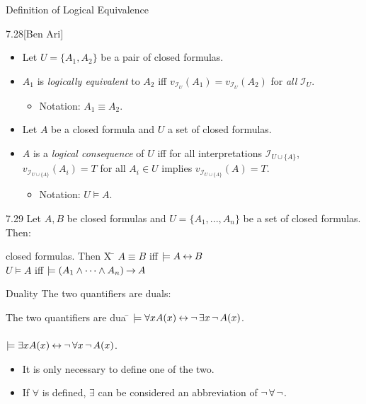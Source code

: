 \begin{wideslide}[bm=,toc=]{Definition of Logical Equivalence}
\begin{defn}{7.28}[Ben Ari]
\end{defn}
\vspace{-2ex}
\begin{itemize}
\item<2-> Let $U = \{A_1,A_2\}$ be a pair of closed formulas. 
\item<3-> $A_1$ is \emph{logically equivalent} to $A_2$ iff \pause[3] $v_{{\mathcal{I}_U}}(A_1) =
v_{{\mathcal{I}_U}}(A_2)$ for \emph{all} $\mathcal{I}_U$.
\begin{itemize}
\item<5-> Notation: $A_1 \equiv A_2$.
\end{itemize}
\item<6-> Let $A$ be a closed formula and $U$ a set of closed formulas.
\item<7-> $A$ is a \emph{logical consequence} of $U$ iff \pause[4] for all interpretations
$\mathcal{I}_{U \cup \{A\}}$, $v_{\mathcal{I}_{U \cup \{A\}}}(A_i) = T$ for
all $A_i \in U$ implies $v_{\mathcal{I}_{U \cup \{A\}}}(A) = T$. 
\begin{itemize}
\item<9-> Notation: $U \models A$.
\end{itemize}
\end{itemize}
\vspace{-5mm}
\pause[2]
\begin{thm}{7.29}
Let $A,B$ be closed formulas and $U = \{A_1,...,A_n\}$ be a set of
closed formulas. Then:
\end{thm}
\vspace{-5ex}
\begin{tabbing}
closed formulas. Then X \= \kill
\> $A \equiv B$ iff $\models A \mathbin{\leftrightarrow} B$\\
\> $U \models A$ iff $\models (A_1 \land \cdots \land A_n) \mathbin{\rightarrow} A$
\end{tabbing}

\end{wideslide}

\begin{wideslide}[bm=,toc=]{Duality}
The two quantifiers are duals:
\pause
\begin{tabbing}
The two quantifiers are dua \= \kill
\> $\models \forall x A(x) \mathbin{\leftrightarrow} \mathop{\neg} \exists x \mathop{\neg} A(x)$.\\
\> ~\\ 
\pause
\> $\models \exists x A(x) \mathbin{\leftrightarrow} \mathop{\neg} \forall x \mathop{\neg} A(x)$.
\end{tabbing}
\pause
\begin{itemize}
\item It is only necessary to define one of the two.
\item If $\forall$ is defined, $\exists$ can be considered an abbreviation of
      $\mathop{\neg} \forall \mathop{\neg}$.
\end{itemize}

\end{wideslide}

